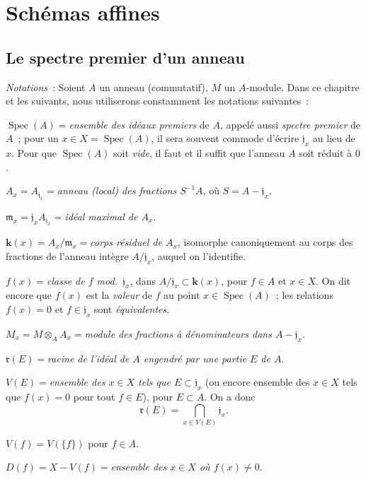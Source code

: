 \setcounter{section}{0}
\section{Schémas affines}
\label{section:I.1-fr}

\setcounter{subsection}{0}
\subsection{Le spectre premier d'un anneau}
\label{subsection:I.1.1-fr}

\begin{env}[1.1.1]
\label{I.1.1.1-fr}
\emph{Notations}~: Soient $A$ un anneau (commutatif), $M$ un $A$-module. Dans
ce chapitre et les suivants, nous utiliserons constamment les notations
suivantes~:

\smallskip
\noindent
$\operatorname{Spec}(A)={}$\emph{ensemble des idéaux premiers} de $A$, appelé
aussi \emph{spectre premier} de $A$~; pour un
$x\in X=\operatorname{Spec}(A)$, il sera souvent commode d'écrire
$\mathfrak{j}_x$ au lieu de $x$. Pour que $\operatorname{Spec}(A)$ soit
\emph{vide}, il faut et il suffit que l'anneau $A$ soit réduit à $0$.

\smallskip
\noindent
$A_x=A_{\mathfrak{j}_x}={}$\emph{anneau (local) des fractions $S^{-1}A$}, où
$S=A-\mathfrak{j}_x$.

\smallskip
\noindent
$\mathfrak{m}_x=\mathfrak{j}_xA_{\mathfrak{j}_x}={}$\emph{idéal maximal de
$A_x$}.

\smallskip
\noindent
$\boldsymbol{k}(x)=A_x/\mathfrak{m}_x={}$\emph{corps résiduel de $A_x$}, isomorphe
canoniquement au corps des fractions de l'anneau intègre
$A/\mathfrak{j}_x$, auquel on l'identifie.

\smallskip
\noindent
$f(x)={}$\emph{classe de $f$ mod.~$\mathfrak{j}_x$}, dans
$A/\mathfrak{j}_x\subset\boldsymbol{k}(x)$, pour $f\in A$ et $x\in X$. On dit encore que
$f(x)$ est la \emph{valeur} de $f$ au point $x\in\operatorname{Spec}(A)$~;
les relations $f(x)=0$ et $f\in\mathfrak{j}_x$ sont \emph{équivalentes}.

\smallskip
\noindent
$M_x=M\otimes_AA_x={}$\emph{module des fractions à dénominateurs dans
$A-\mathfrak{j}_x$}.

\smallskip
\noindent
$\mathfrak{r}(E)={}$\emph{racine de l'idéal de $A$ engendré par une partie
$E$ de $A$}.

\smallskip
\noindent
$V(E)={}$\emph{ensemble des $x\in X$ tels que $E\subset\mathfrak{j}_x$}
(ou encore ensemble des $x\in X$ tels que $f(x)=0$ pour tout $f\in E$), pour
$E\subset A$. On a donc
\begin{equation}
  \mathfrak{r}(E)=\bigcap_{x\in V(E)}\mathfrak{j}_x.
  \tag{1.1.1.1}\label{I.1.1.1.1-fr}
\end{equation}

\smallskip
\noindent
$V(f)=V(\{f\})$ pour $f\in A$.

\smallskip
\noindent
$D(f)=X-V(f)={}$\emph{ensemble des $x\in X$ où $f(x)\neq0$}.
\end{env}

